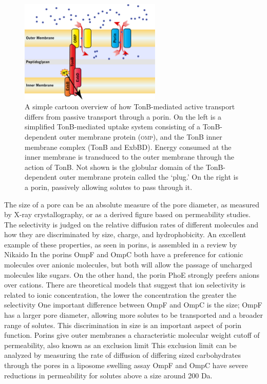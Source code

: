 \begin{figure}[htb]
  	\begin{center}
   		\includegraphics[width=0.6\textwidth]{intro/img/porinvstonb.pdf}
   	\end{center}
   	\caption[TonB-mediated transport versus transport througha porin]{ A simple
      cartoon overview of how TonB-mediated active transport differs from
      passive transport through a porin. On the left is a simplified
      TonB-mediated uptake system consisting of a TonB-dependent outer membrane
      protein (\textsc{omp}), and the TonB inner membrane complex (TonB and
      ExbBD). Energy consumed at the inner membrane is transduced to the outer
      membrane through the action of TonB. Not shown is the globular domain of
      the TonB-dependent outer membrane protein called the `plug.' On the right is a porin, passively allowing
      solutes to pass through it.
}
\label{fig:porinvstonb}
\end{figure}

The size of a pore can be an absolute measure of the pore diameter, as measured by X-ray crystallography, or as a derived figure based on permeability studies. The selectivity is
judged on the relative diffusion rates of different molecules and how they are discriminated by size, charge, and hydrophobicity. An excellent example of these properties, as seen
in \ecoli{} porins, is assembled in a review by Nikaido In \ecoli{} the porins OmpF and OmpC both have a preference for cationic molecules over
anionic molecules, but both will allow the passage of uncharged molecules like sugars. On the other hand, the \ecoli{} porin PhoE strongly prefers anions over cations. There are
theoretical models that suggest that ion selectivity is related to ionic concentration, the lower the concentration the greater the selectivity One important
difference between OmpF and OmpC is the size; OmpF has a larger pore diameter, allowing more solutes to be transported and a broader range of solutes. This discrimination in size
is an important aspect of porin function. Porins give outer membranes a characteristic molecular weight cutoff of permeability, also known as an exclusion
limit This exclusion limit can be analyzed by measuring the rate of diffusion of differing sized carbohydrates through the pores in a liposome swelling
assay OmpF and OmpC have severe reductions in permeability for solutes above a size around 200 Da.
 
